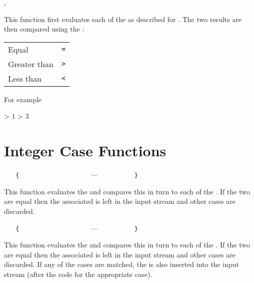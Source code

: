 \documentclass[oneside]{book}
\begin{document}
\begin{function}{\IntCompare,\IntCompareTF}
\begin{syntax}
   
     
\end{syntax}
This function first evaluates each of the 
as described for . The two results are then
compared using the :\par
{\centering\begin{tabular}{ll}
Equal        & \texttt{=} \\
Greater than & \texttt{>} \\
Less than    & \texttt{<} \\
\end{tabular}\par}
For example
\begin{demohigh}
 > {1} {} {}
 > {3} {} {}
\end{demohigh}
\end{function}

\section{Integer Case Functions}

\begin{function}{\IntCase}
\begin{syntax}
 
~ ~ \verb|{|
~ ~ ~ ~  
~ ~ ~ ~  
~ ~ ~ ~ $\cdots$
~ ~ ~ ~  
~ ~ \verb|}|
\end{syntax}
This function evaluates the  and
compares this in turn to each of the
. If the two are equal then the
associated  is left in the input stream
and other cases are discarded.
\end{function}

\begin{function}{\IntCaseT}
\begin{syntax}
 
~ ~ \verb|{|
~ ~ ~ ~  
~ ~ ~ ~  
~ ~ ~ ~ $\cdots$
~ ~ ~ ~  
~ ~ \verb|}|
~ ~ 
\end{syntax}
This function evaluates the  and
compares this in turn to each of the
. If the two are equal then the
associated  is left in the input stream
and other cases are discarded. If any of the
cases are matched, the  is also inserted into the
input stream (after the code for the appropriate case).
\end{function}
\end{document}
